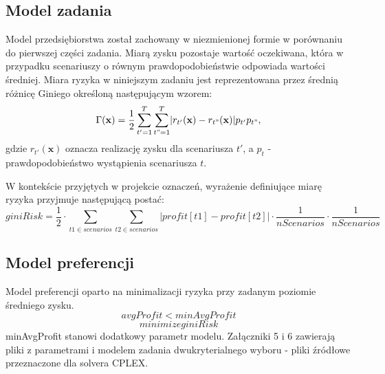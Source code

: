\documentclass[11pt,a4paper]{article}
\begin{document}
\subsection{Model zadania}
Model przedsiębiorstwa został zachowany w niezmienionej formie w porównaniu do pierwszej części zadania. Miarą zysku pozostaje wartość oczekiwana, która w przypadku scenariuszy o równym prawdopodobieństwie odpowiada wartości średniej. Miara ryzyka w niniejszym zadaniu jest reprezentowana przez średnią różnicę Giniego określoną następującym wzorem:
\begin{equation}
\Gamma(\mathbf{x})=\frac{1}{2}\sum_{t'=1}^{T}\sum_{t"=1}^{T}\lvert r_{t'}(\mathbf{x})-r_{t"}(\mathbf{x})\rvert p_{t'}p_{t"}, 
\end{equation}
gdzie $r_{t'}(\mathbf{x})$ oznacza realizację zysku dla scenariusza $t'$, a $p_{t}$ - prawdopodobieństwo wystąpienia scenariusza $t$.

W kontekście przyjętych w projekcie oznaczeń, wyrażenie definiujące miarę ryzyka przyjmuje następującą postać:
\begin{equation}
giniRisk = \frac{1}{2}\cdot\sum_{t1 \in scenarios}\sum_{t2 \in scenarios} \lvert profit[t1]-profit[t2] \rvert \cdot \frac{1}{nScenarios} \cdot \frac{1}{nScenarios} 
\end{equation}

\subsection{Model preferencji}
Model preferencji oparto na minimalizacji ryzyka przy zadanym poziomie średniego zysku.
\begin{equation}
avgProfit<minAvgProfit
\end{equation}
\begin{equation}
minimize giniRisk
\end{equation}
minAvgProfit stanowi dodatkowy parametr modelu. Załączniki 5 i 6 zawierają pliki z parametrami i modelem zadania dwukryterialnego wyboru - pliki źródłowe przeznaczone dla solvera CPLEX. 
\end{document}
